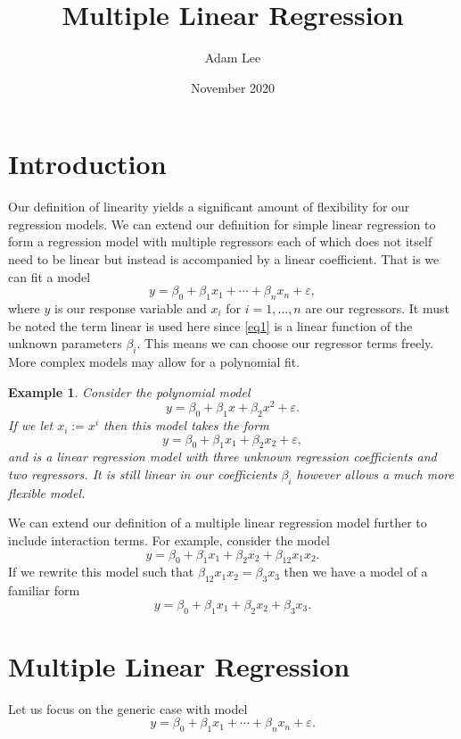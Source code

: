 \documentclass[10pt,a4paper, twocolumn, conference]{IEEEtran}
\author{Adam Lee}
\title{Multiple Linear Regression}
\date{November 2020}
\theoremstyle{own}
\newtheorem{example}{Example}
\theoremstyle{definition}
\theoremstyle{plain}
\begin{document}
\maketitle
\pagebreak
\section{Introduction}
Our definition of linearity yields a significant amount of flexibility for our regression models. We can extend our definition for simple linear regression to form a regression model with multiple regressors each of which does not itself need to be linear but instead is accompanied by a linear coefficient. That is we can fit a model
\begin{equation} \label{eq1}
y = \beta_0 + \beta_1 x_1 + \cdots + \beta_n x_n + \varepsilon,
\end{equation}
where $y$ is our response variable and $x_i$ for $i = 1, \ldots, n$ are our regressors. It must be noted the term linear is used here since \cref{eq1} is a linear function of the unknown parameters $\beta_i$. This means we can choose our regressor terms freely. More complex models may allow for a polynomial fit.
\begin{example}
Consider the polynomial model
\begin{equation}
y = \beta_0 + \beta_1 x + \beta_2 x^2 + \varepsilon.
\end{equation}
If we let $x_i := x^i$ then this model takes the form
\begin{equation}
y = \beta_0 + \beta_1 x_1 + \beta_2 x_2 + \varepsilon,
\end{equation}
and is a linear regression model with three unknown regression coefficients and two regressors. It is still linear in our coefficients $\beta_i$ however allows a much more flexible model.
\end{example}

We can extend our definition of a multiple linear regression model further to include interaction terms. For example, consider the model
\begin{equation}
y = \beta_0 + \beta_1 x_1 + \beta_2 x_2 + \beta_{12} x_1 x_2.
\end{equation}
If we rewrite this model such that $\beta_{12} x_1 x_2 = \beta_3 x_3$ then we have a model of a familiar form
\[ y = \beta_0 + \beta_1 x_1 + \beta_2 x_2 + \beta_3 x_3.\]

\section{Multiple Linear Regression}
Let us focus on the generic case with model
\begin{equation}
y = \beta_0 + \beta_1 x_1 + \cdots + \beta_n x_n + \varepsilon.
\end{equation}
\end{document}

